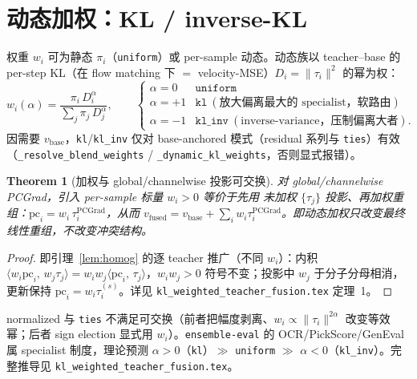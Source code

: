 \documentclass[11pt,a4paper]{article}
\newcommand{\PC}{\mathrm{PCGrad}}
\newcommand{\vb}{v_{\mathrm{base}}}
\newcommand{\vfused}{v_{\mathrm{fused}}}
\newcommand{\inner}[2]{\langle #1,\, #2\rangle}
\newcommand{\norm}[1]{\lVert #1\rVert}
\theoremstyle{plain}
\newtheorem{theorem}{Theorem}
\theoremstyle{definition}
\begin{document}
\section{动态加权：KL / inverse-KL}
\label{sec:weighting}

权重 $w_i$ 可为静态 $\pi_i$（\texttt{uniform}）或 per-sample 动态。动态族以 teacher--base 的 per-step KL（在 flow matching 下 $=$ velocity-MSE）$D_i=\norm{\tau_i}^2$ 的幂为权：
\begin{equation}
w_i(\alpha)=\frac{\pi_i\,D_i^{\alpha}}{\sum_j \pi_j\,D_j^{\alpha}},\qquad
\begin{cases}
\alpha=0 & \texttt{uniform}\\
\alpha=+1 & \texttt{kl}\ (\text{放大偏离最大的 specialist，软路由})\\
\alpha=-1 & \texttt{kl\_inv}\ (\text{inverse-variance，压制偏离大者}).
\end{cases}
\label{eq:kl_weights}
\end{equation}
因需要 $\vb$，\texttt{kl}/\texttt{kl\_inv} 仅对 base-anchored 模式（residual 系列与 \texttt{ties}）有效（\texttt{\_resolve\_blend\_weights} / \texttt{\_dynamic\_kl\_weights}，否则显式报错）。

\begin{theorem}[加权与 global/channelwise 投影可交换]
\label{thm:commute}
对 global/channelwise PCGrad，引入 per-sample 标量 $w_i>0$ 等价于先用 \emph{未加权} $\{\tau_j\}$ 投影、再加权重组：$\mathrm{pc}_i=w_i\,\tau_i^{\PC}$，从而 $\vfused=\vb+\sum_i w_i\tau_i^{\PC}$。即动态加权只改变最终线性重组，不改变冲突结构。
\end{theorem}
\begin{proof}
即引理~\ref{lem:homog} 的逐 teacher 推广（不同 $w_i$）：内积 $\inner{w_i\mathrm{pc}_i}{w_j\tau_j}=w_iw_j\inner{\mathrm{pc}_i}{\tau_j}$，$w_iw_j>0$ 符号不变；投影中 $w_j$ 于分子分母相消，更新保持 $\mathrm{pc}_i=w_i\tau_i^{(s)}$。详见 \texttt{kl\_weighted\_teacher\_fusion.tex} 定理~1。
\end{proof}

\noindent normalized 与 \texttt{ties} 不满足可交换（前者把幅度剥离、$w_i\propto\norm{\tau_i}^{2\alpha}$ 改变等效幂；后者 sign election 显式用 $w_i$）。\texttt{ensemble-eval} 的 OCR/PickScore/GenEval 属 specialist 制度，理论预测 $\alpha>0$（\texttt{kl}）$\gg$ \texttt{uniform} $\gg$ $\alpha<0$（\texttt{kl\_inv}）。完整推导见 \texttt{kl\_weighted\_teacher\_fusion.tex}。

\end{document}
